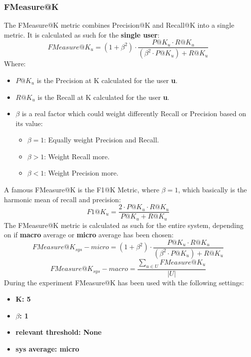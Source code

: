 \documentclass[11pt]{article}
\begin{document}
\subsubsection{FMeasure@K}\label{subsubsec:f-meas-k}
The FMeasure@K metric combines Precision@K and Recall@K into a single metric.
It is calculated as such for the \textbf{single user}:
\hfill\break
\hfill\break
    \[
        FMeasure@K_u = (1 + \beta^2) \cdot \frac{P@K_u \cdot R@K_u}{(\beta^2 \cdot P@K_u) + R@K_u}
    \]
\hfill\break
\hfill\break
    Where:
\begin{itemize}
    \item $P@K_u$ is the Precision at K calculated for the user \textbf{u}.
    \item $R@K_u$ is the Recall at K calculated for the user \textbf{u}.
    \item $\beta$ is a real factor which could weight differently Recall or Precision based on its value:
    \begin{itemize}
        \item $\beta = 1$: Equally weight Precision and Recall.
        \item $\beta > 1$: Weight Recall more.
        \item $\beta < 1$: Weight Precision more.
    \end{itemize}
\end{itemize}
\hfill\break
\hfill\break
A famous FMeasure@K is the F1@K Metric, where $\beta = 1$, which basically is the harmonic mean of recall and
precision:
\hfill\break
\hfill\break
    \[
        F1@K_u = \frac{2 \cdot P@K_u \cdot R@K_u}{P@K_u + R@K_u}
    \]
\hfill\break
\hfill\break
The FMeasure@K metric is calculated as such for the entire system, depending on if \textbf{macro} average or
\textbf{micro} average has been chosen:
\hfill\break
\hfill\break
    \[
        FMeasure@K_{sys} - micro = (1 + \beta^2) \cdot \frac{P@K_u \cdot R@K_u}{(\beta^2 \cdot P@K_u) + R@K_u}
    \]
\hfill\break
\hfill\break
    \[
        FMeasure@K_{sys} - macro = \frac{\sum_{u \in U} FMeasure@K_u}{|U|}
    \]
\hfill\break
\hfill\break
During the experiment FMeasure@K has been used with the following settings:
\begin{itemize}
    \item \textbf{K: 5}
    \item  \textbf{$\beta$: 1}
    \item \textbf{relevant threshold: None }
    \item \textbf{sys average: micro }
\end{itemize}
\hfill\break
\hfill\break
\end{document}
